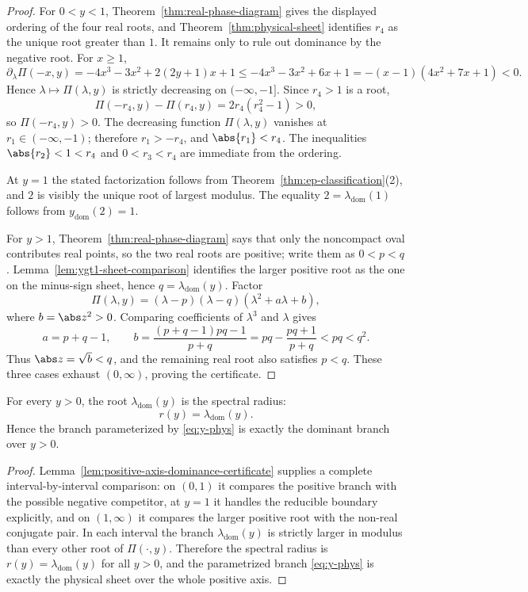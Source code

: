 \begin{proof}
For \(0<y<1\), Theorem~\ref{thm:real-phase-diagram} gives the displayed ordering of the four real roots, and Theorem~\ref{thm:physical-sheet} identifies \(r_4\) as the unique root greater than \(1\).
It remains only to rule out dominance by the negative root.
For \(x\ge1\),
\[
\partial_\lambda\Pi(-x,y)
=
-4x^3-3x^2+2(2y+1)x+1
\le
-4x^3-3x^2+6x+1
=
-(x-1)(4x^2+7x+1)<0.
\]
Hence \(\lambda\mapsto\Pi(\lambda,y)\) is strictly decreasing on \((-\infty,-1]\).  Since \(r_4>1\) is a root,
\[
\Pi(-r_4,y)-\Pi(r_4,y)=2r_4(r_4^2-1)>0,
\]
so \(\Pi(-r_4,y)>0\).  The decreasing function \(\Pi(\lambda,y)\) vanishes at \(r_1\in(-\infty,-1)\); therefore \(r_1>-r_4\), and \(\abs{r_1}<r_4\).  The inequalities \(\abs{r_2}<1<r_4\) and \(0<r_3<r_4\) are immediate from the ordering.

At \(y=1\) the stated factorization follows from Theorem~\ref{thm:ep-classification}(2), and \(2\) is visibly the unique root of largest modulus.  The equality \(2=\lambda_{\mathrm{dom}}(1)\) follows from \(y_{\mathrm{dom}}(2)=1\).

For \(y>1\), Theorem~\ref{thm:real-phase-diagram} says that only the noncompact oval contributes real points, so the two real roots are positive; write them as \(0<p<q\).  Lemma~\ref{lem:ygt1-sheet-comparison} identifies the larger positive root as the one on the minus-sign sheet, hence \(q=\lambda_{\mathrm{dom}}(y)\).  Factor
\[
\Pi(\lambda,y)=(\lambda-p)(\lambda-q)(\lambda^2+a\lambda+b),
\]
where \(b=\abs z^2>0\).  Comparing coefficients of \(\lambda^3\) and \(\lambda\) gives
\[
a=p+q-1,
\qquad
b=\frac{(p+q-1)pq-1}{p+q}
=pq-\frac{pq+1}{p+q}<pq<q^2.
\]
Thus \(\abs z=\sqrt b<q\), and the remaining real root also satisfies \(p<q\).  These three cases exhaust \((0,\infty)\), proving the certificate.
\end{proof}

\begin{proposition}\label{prop:global-dominance}
For every $y>0$, the root $\lambda_{\mathrm{dom}}(y)$ is the spectral radius:
\[
r(y)=\lambda_{\mathrm{dom}}(y).
\]
Hence the branch parameterized by \eqref{eq:y-phys} is exactly the dominant branch over $y>0$.
\end{proposition}

\begin{proof}
Lemma~\ref{lem:positive-axis-dominance-certificate} supplies a complete interval-by-interval comparison: on \((0,1)\) it compares the positive branch with the possible negative competitor, at \(y=1\) it handles the reducible boundary explicitly, and on \((1,\infty)\) it compares the larger positive root with the non-real conjugate pair.
In each interval the branch \(\lambda_{\mathrm{dom}}(y)\) is strictly larger in modulus than every other root of \(\Pi(\cdot,y)\).  Therefore the spectral radius is \(r(y)=\lambda_{\mathrm{dom}}(y)\) for all \(y>0\), and the parametrized branch \eqref{eq:y-phys} is exactly the physical sheet over the whole positive axis.
\end{proof}


